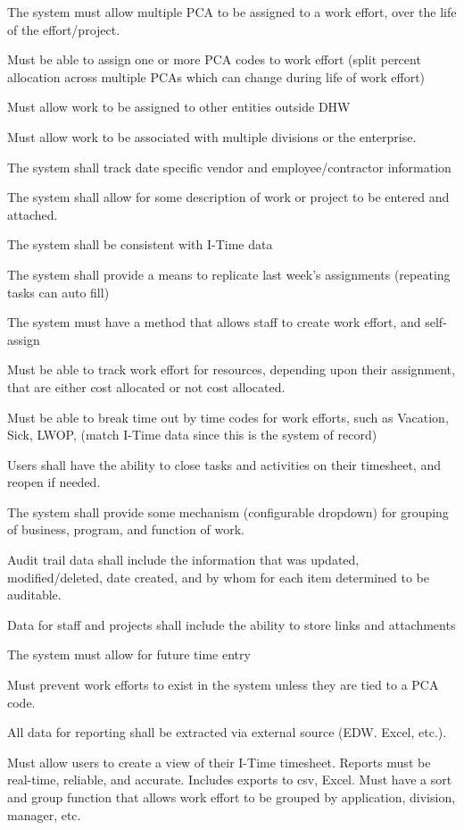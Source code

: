 \documentclass[letterpaper]{article}
\begin{document}
The system must allow multiple PCA to be assigned to a work effort, over the life of the effort/project.

Must be able to assign one or more PCA codes to work effort (split percent allocation across multiple PCAs which can change during life of work effort)

Must allow work to be assigned to other entities outside DHW

Must allow work to be associated with multiple divisions or the enterprise.

The system shall track date specific vendor and employee/contractor information

The system shall allow for some description of work or project to be entered and attached.

The system shall be consistent with I-Time data

The system shall provide a means to replicate last week's assignments (repeating tasks can auto fill)

The system must have a method that allows staff to create work effort, and self-assign

Must be able to track work effort for resources, depending upon their assignment, that are either cost allocated or not cost allocated.

Must be able to break time out by time codes for work efforts, such as Vacation, Sick, LWOP, (match I-Time data since this is the system of record)

Users shall have the ability to close tasks and activities on their timesheet, and reopen if needed.

The system shall provide some mechanism (configurable dropdown) for  grouping of business, program, and function of work.

Audit trail data shall include the information that was updated, modified/deleted, date created, and by whom for each item determined to be auditable.

Data for staff and projects shall include the ability to store links and attachments

The system must allow for future time entry

Must prevent work efforts to exist in the system unless they are tied to a PCA code.

All data for reporting shall be extracted via external source (EDW. Excel, etc.).

Must allow users to create a view of their I-Time timesheet. 
Reports must be real-time, reliable, and accurate. Includes exports to csv, Excel. 
Must have a sort and group function that allows work effort to be grouped by application, division, manager, etc.
\end{document}
